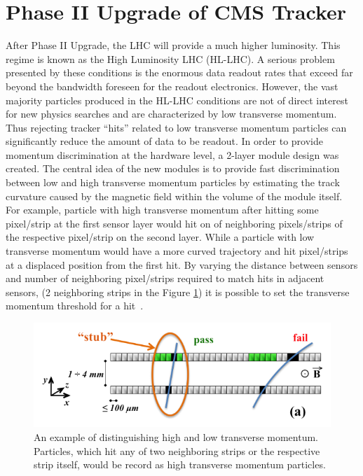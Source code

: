 \section{Phase II Upgrade of CMS Tracker}

After Phase II Upgrade, the LHC will provide a much higher luminosity. This regime is known as the High Luminosity LHC (HL-LHC). A serious problem presented by these conditions is the enormous data readout rates that exceed far beyond the bandwidth foreseen for the readout electronics.
However, the vast majority particles produced in the HL-LHC conditions are not of direct interest for new physics searches and are characterized by low transverse momentum. Thus rejecting tracker “hits” related to low transverse momentum particles can significantly reduce the amount of data to be readout. In order to provide momentum discrimination at the hardware level, a 2-layer module design was created. The central idea of the new modules is to provide fast discrimination between low and high transverse momentum particles by estimating the track curvature caused by the magnetic field within the volume of the module itself. For example, particle with high transverse momentum after hitting some pixel/strip at the first sensor layer would hit on of neighboring pixels/strips of the respective pixel/strip on the second layer. While a particle with low transverse momentum would have a more curved trajectory and hit pixel/strips at a displaced position from the first hit. By varying the distance between sensors and number of neighboring pixel/strips required to match hits in adjacent sensors, (2 neighboring strips in the Figure \ref{fig:low_high_pT}) it is possible to set the transverse momentum threshold for a hit~\cite{CMS_TECH_PHASE_II}.


\begin{figure}[ht]\centering
\includegraphics[width=0.8\linewidth]{Data/Introduction/Low_high_pT.png}
\caption{An example of distinguishing high and low transverse momentum. Particles, which hit any of two neighboring strips or the respective strip itself, would be record as high transverse momentum particles.}
\label{fig:low_high_pT}
\end{figure}


